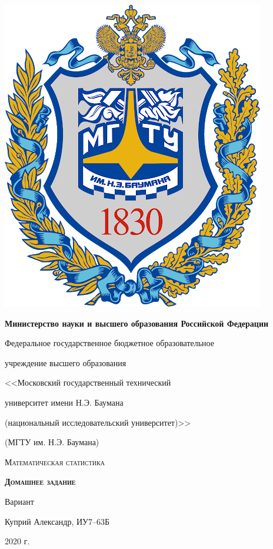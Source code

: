 \begin{titlepage}
    \centering

    \vspace*{1.15cm}
    \includegraphics[scale=0.2]{images/bmstu_logo.png}\par
    \vspace{0.5cm}

    {\bfseries\small
        Министерство науки и высшего образования Российской Федерации\par
        Федеральное государственное бюджетное образовательное\par
        учреждение высшего образования\par
        <<Московский государственный технический\par
        университет имени Н.Э. Баумана\par
        (национальный исследовательский университет)>>\par
        (МГТУ им. Н.Э. Баумана)\par
    }
    \vspace{2.0cm}

    {\LARGE\scshape {Математическая статистика}\par}
    \vspace{1.0cm}

    {\huge\bfseries\scshape {Домашнее задание }\par}
    \vspace{0.25cm}
    {\Large Вариант }
    \vspace{0.5cm}

    {\Large Куприй Александр, ИУ7--63Б\par}

    \vfill

    {\Large 2020 г.\par}

\end{titlepage}

